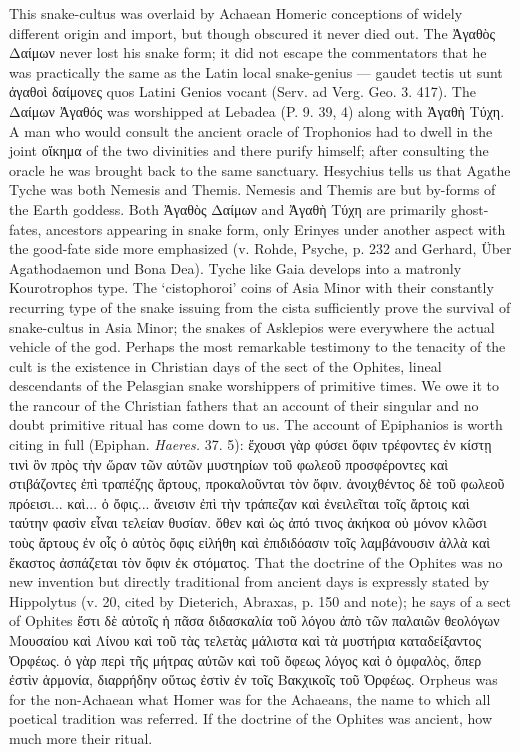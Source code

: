 \documentclass[a4paper, 11pt, oneside, polutonikogreek, english]{article}
\begin{document}
This snake-cultus was overlaid by Achaean Homeric conceptions of widely different origin and import, but though obscured it never died out. The Ἀγαθὸς Δαίμων never lost his snake form; it did not escape the commentators that he was practically the same as the Latin local snake-genius --- gaudet tectis ut sunt ἀγαθοὶ δαίμονες quos Latini Genios vocant (Serv. ad Verg. Geo. 3. 417). The Δαίμων Ἀγαθός was worshipped at Lebadea (P. 9. 39, 4) along with Ἀγαθὴ Τύχη. A man who would consult the ancient oracle of Trophonios had to dwell in the joint οἴκημα of the two divinities and there purify himself; after consulting the oracle he was brought back to the same sanctuary. Hesychius tells us that Agathe Tyche was both Nemesis and Themis. Nemesis and Themis are but by-forms of the Earth goddess. Both Ἀγαθὸς Δαίμων and Ἀγαθὴ Τύχη are primarily ghost-fates, ancestors appearing in snake form, only Erinyes under another aspect with the good-fate side more emphasized (v. Rohde, Psyche, p. 232 and Gerhard, Über Agathodaemon und Bona Dea). Tyche like Gaia develops into a matronly Kourotrophos type. The `cistophoroi' coins of Asia Minor with their constantly recurring type of the snake issuing from the cista sufficiently prove the survival of snake-cultus in Asia Minor; the snakes of Asklepios were everywhere the actual vehicle of the god. Perhaps the most remarkable testimony to the tenacity of the cult is the existence in Christian days of the sect of the Ophites, lineal descendants of the Pelasgian snake worshippers of primitive times. We owe it to the rancour of the Christian fathers that an account of their singular and no doubt primitive ritual has come down to us. The account of Epiphanios is worth citing in full (Epiphan. \emph{Haeres.} 37. 5): ἔχουσι γὰρ φύσει ὄφιν τρέφοντες ἐν κίστῃ τινὶ ὃν πρὸς τὴν ὥραν τῶν αὐτῶν μυστηρίων τοῦ φωλεοῦ προσφέροντες καὶ στιβάζοντες ἐπὶ τραπέζης ἄρτους, προκαλοῦνται τὸν ὄφιν. ἀνοιχθέντος δὲ τοῦ φωλεοῦ πρόεισι... καὶ... ὁ ὄφις... ἄνεισιν ἐπὶ τὴν τράπεζαν καὶ ἐνειλεῖται τοῖς ἄρτοις καὶ ταύτην φασὶν εἶναι τελείαν θυσίαν. ὅθεν καὶ ὡς ἀπό τινος ἀκήκοα οὐ μόνον κλῶσι τοὺς ἄρτους ἐν οἷς ὁ αὐτὸς ὄφις εἰλήθη καὶ ἐπιδιδόασιν τοῖς λαμβάνουσιν ἀλλὰ καὶ ἕκαστος ἀσπάζεται τὸν ὄφιν ἐκ στόματος. That the doctrine of the Ophites was no new invention but directly traditional from ancient days is expressly stated by Hippolytus (v. 20, cited by Dieterich, Abraxas, p. 150 and note); he says of a sect of Ophites  ἔστι δὲ αὐτοῖς ἡ πᾶσα διδασκαλία τοῦ λόγου ἀπὸ τῶν παλαιῶν θεολόγων Μουσαίου καὶ Λίνου καὶ τοῦ τὰς τελετὰς μάλιστα καὶ τὰ μυστήρια καταδείξαντος Ὀρφέως. ὁ γὰρ περὶ τῆς μήτρας αὐτῶν καὶ τοῦ ὄφεως λόγος καὶ ὁ ὀμφαλὸς, ὅπερ ἐστὶν ἁρμονία, διαρρήδην οὕτως ἐστὶν ἐν τοῖς Βακχικοῖς τοῦ Ὀρφέως. Orpheus was for the non-Achaean what Homer was for the Achaeans, the name to which all poetical tradition was referred. If the doctrine of the Ophites was ancient, how much more their ritual.
\end{document}
